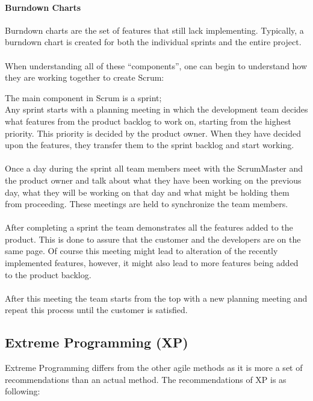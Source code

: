 \paragraph{Burndown Charts}
Burndown charts are the set of features that still lack implementing. Typically, a burndown chart is created for both the individual sprints and the entire project.\\
\\
When understanding all of these ``components'', one can begin to understand how they are working together to create Scrum:

The main component in Scrum is a sprint; \\
Any sprint starts with a planning meeting in which the development team decides what features from the product backlog to work on, starting from the highest priority. This priority is decided by the product owner. When they have decided upon the features, they transfer them to the sprint backlog and start working. \\
\\
Once a day during the sprint all team members meet with the ScrumMaster and the product owner and talk about what they have been working on the previous day, what they will be working on that day and what might be holding them from proceeding. These meetings are held to synchronize the team members.\\
\\
After completing a sprint the team demonstrates all the features added to the product. This is done to assure that the customer and the developers are on the same page. Of course this meeting might lead to alteration of the recently implemented features, however, it might also lead to more features being added to the product backlog.\\
\\
After this meeting the team starts from the top with a new planning meeting and repeat this process until the customer is satisfied.

\subsection{Extreme Programming (XP)}
Extreme Programming differs from the other agile methods as it is more a set of recommendations than an actual method. The recommendations of XP is as following:

